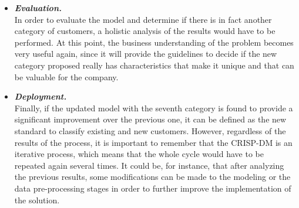 \documentclass{article}
\begin{document}
\begin{enumerate}[label=(\alph*)]
\begin{enumerate}[label=\arabic*.]
\begin{itemize}
    \item \textbf{\textit{Evaluation.}}\\
    In order to evaluate the model and determine if there is in fact another category of customers, a holistic analysis of the results would have to be performed. At this point, the business understanding of the problem becomes very useful again, since it will provide the guidelines to decide if the new category proposed really has characteristics that make it unique and that can be valuable for the company.
    \item \textbf{\textit{Deployment.}}\\
    Finally, if the updated model with the seventh category is found to provide a significant improvement over the previous one, it can be defined as the new standard to classify existing and new customers. However, regardless of the results of the process, it is important to remember that the CRISP-DM is an iterative process, which means that the whole cycle would have to be repeated again several times. It could be, for instance, that after analyzing the previous results, some modifications can be made to the modeling or the data pre-processing stages in order to further improve the implementation of the solution.
\end{itemize}

        \end{enumerate}
    \end{enumerate}

\nocite{*}
\end{document}
